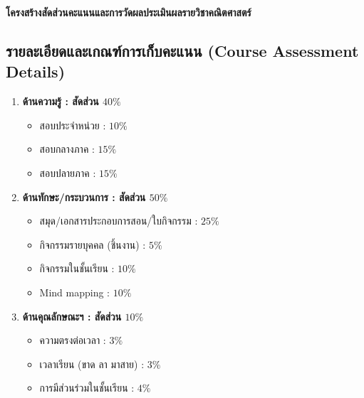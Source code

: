 

\clearpage
\thispagestyle{empty} 

\begin{center}
	\begin{tcolorbox}[
		colback=cambridgeblue!15,
		colframe=cambridgeblue!50!black,
		boxrule=0.8pt,
		arc=2mm,
		width=\linewidth
		]
		\centering
		{\Large\bfseries โครงสร้างสัดส่วนคะแนนและการวัดผลประเมินผลรายวิชาคณิตศาสตร์}
	\end{tcolorbox}
\end{center}

\vspace{0.3cm}

\subsection*{รายละเอียดและเกณฑ์การเก็บคะแนน (Course Assessment Details)}

\vspace{0.2cm}

\begin{enumerate}[label=\arabic*)., leftmargin=2em, itemsep=0.8em]
	\item \textbf{ด้านความรู้ : สัดส่วน $40\%$}
	\begin{itemize}
		\item สอบประจำหน่วย : $10\%$
		\item สอบกลางภาค : $15\%$
		\item สอบปลายภาค : $15\%$
	\end{itemize}
	
	\vspace{0.1cm}
	\item \textbf{ด้านทักษะ/กระบวนการ : สัดส่วน $50\%$}
	\begin{itemize}
		\item สมุด/เอกสารประกอบการสอน/ใบกิจกรรม : $25\%$
		\item กิจกรรมรายบุคคล (ชิ้นงาน) : $5\%$
		\item กิจกรรมในชั้นเรียน : $10\%$
		\item Mind mapping : $10\%$
	\end{itemize}
	
	\vspace{0.1cm}
	\item \textbf{ด้านคุณลักษณะฯ : สัดส่วน $10\%$}
	\begin{itemize}
		\item ความตรงต่อเวลา : $3\%$
		\item เวลาเรียน (ขาด ลา มาสาย) : $3\%$
		\item การมีส่วนร่วมในชั้นเรียน : $4\%$
	\end{itemize}
\end{enumerate}

